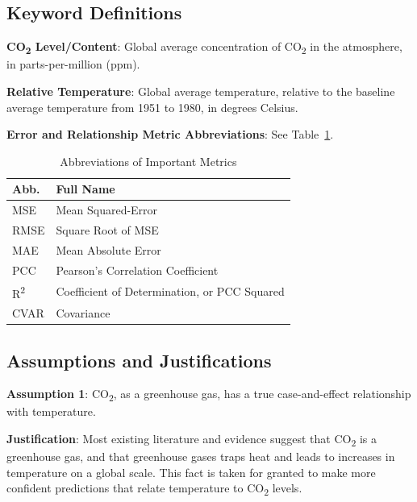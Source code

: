 \documentclass[12pt]{mcmthesis}
\begin{document}
    \subsection{Keyword Definitions}
    \noindent\textbf{CO\textsubscript{2} Level/Content}: Global average concentration of CO\textsubscript{2} in the atmosphere, in parts-per-million (ppm).

    \noindent\textbf{Relative Temperature}: Global average temperature, relative to the baseline average temperature from 1951 to 1980, in degrees Celsius.

    \noindent\textbf{Error and Relationship Metric Abbreviations}: See Table~\ref{tab:err_abb}.

    \begin{table}[H]
        \centering
        \begin{tabular}{ll}
            \toprule
            Abb.                 & Full Name                                    \\
            \midrule
            MSE                  & Mean Squared-Error                           \\
            RMSE                 & Square Root of MSE                           \\
            MAE                  & Mean Absolute Error                          \\
            PCC                  & Pearson's Correlation Coefficient            \\
            R\textsuperscript{2} & Coefficient of Determination, or PCC Squared \\
            CVAR                 & Covariance                                   \\
            \bottomrule
        \end{tabular}
        \vspace{8pt}
        \caption{Abbreviations of Important Metrics}
        \label{tab:err_abb}
    \end{table}

    \subsection{Assumptions and Justifications}
    \noindent\textbf{Assumption 1}: CO\textsubscript{2}, as a greenhouse gas, has a true case-and-effect relationship with temperature.

    \vspace{-6pt}
    \noindent\textbf{Justification}: Most existing literature and evidence suggest that CO\textsubscript{2} is a greenhouse gas, and that greenhouse gases traps heat and leads to increases in temperature on a global scale. This fact is taken for granted to make more confident predictions that relate temperature to CO\textsubscript{2} levels.
\end{document}
